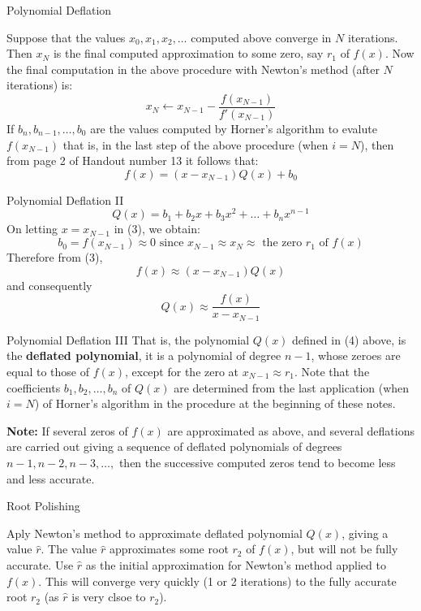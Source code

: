 \documentclass[12pt]{beamer}
\begin{document}
\begin{frame}{Polynomial Deflation} 

Suppose that the values $x_0, x_1, x_2, \dots $ computed above converge in $N$ iterations. Then $x_N$ is the final computed approximation to some zero, say $r_1$ of $f(x)$. Now the final computation in the above procedure with Newton's method (after $N$ iterations) is: 
\[
x_N \leftarrow x_{N-1} - \frac{f(x_{N-1})}{f'(x_{N-1})}
\] 
\noindent 
If $b_n, b_{n-1}, \dots, b_0$ are the values computed by Horner's algorithm to evalute $f(x_{N-1})$ that is, in the last step of the above procedure (when $i=N$), then from page 2 of Handout number 13 it follows that: 
\begin{equation} 
f(x) = (x - x_{N-1}) Q(x) + b_0
\end{equation}
\end{frame} 


\begin{frame}{Polynomial Deflation II} 
\begin{equation} 
Q(x) = b_1 + b_2 x + b_3 x^2 + \dots + b_n x^{n-1} 
\end{equation} 
\noindent 
On letting $x=x_{N-1}$ in (3), we obtain: 
\[
 b_0 = f(x_{N-1}) \approx 0 \mbox{ since }  x_{N-1} \approx x_{N} \approx \mbox{ the zero } r_{1} \mbox{ of } f(x) 
\]
\noindent 
Therefore from (3), 
\[
f(x) \approx (x-x_{N-1}) Q(x) 
\]
\noindent 
and consequently 
\[ 
Q(x) \approx \frac{f(x)}{x-x_{N-1}} 
\]
\end{frame} 

\begin{frame}{Polynomial Deflation III} 
That is, the polynomial $Q(x)$ defined in (4) above, is the {\bf deflated polynomial}, it is a polynomial of degree $n-1$, whose zeroes are equal to those of $f(x)$, except for the zero at $x_{N-1} \approx r_1$. Note that the coefficients $b_1, b_2, \dots, b_n$ of $Q(x)$ are determined from the last application (when $i=N$) of Horner's algorithm in the procedure at the beginning of these notes. 

\noindent 
{\bf Note: } If several zeros of $f(x)$ are approximated as above, and several deflations are carried out giving a sequence of deflated polynomials of degrees $n-1, n-2, n-3, \dots,$ then the successive computed zeros tend to become less and less accurate. 
\end{frame} 
\noindent 

\begin{frame}{Root Polishing} 

Aply Newton's method to approximate deflated polynomial $Q(x)$, giving a value $\hat r$. The value $\hat r$ approximates some root $r_2$ of $f(x)$, but will not be fully accurate. Use $\hat r$ as the initial approximation for Newton's method applied to $f(x)$. This will converge very quickly (1 or 2 iterations) to the fully accurate root $r_2$ (as $\hat r$ is very clsoe to $r_2$). 


\end{frame} 
\end{document}
